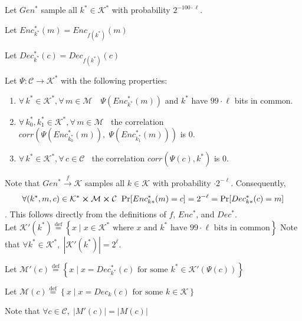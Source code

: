 \documentclass{article}
\newcommand*{\defeq}{\stackrel{\text{def}}{=}}
\begin{document}
    Let $Gen^{*}$ sample all $k^{*} \in \mathcal{K}^{*}$ with probability $2^{-100\cdot\ell}$.
    
    Let $Enc^{*}_{k^*}(m) = Enc_{f(k^*)}(m)$
    
    Let $Dec^{*}_{k^*}(c) = Dec_{f(k^*)}(c)$
   
    Let $\Psi : \mathcal{C} \to \mathcal{K}^{*}$ with the following properties:
    
    \begin{enumerate}
    
    	\item $\forall\, k^{*} \in \mathcal{K}^{*}, \forall\, m \in \mathcal{M} \quad \Psi(Enc^{*}_{k^*}(m))$ and $k^*$ have $99\cdot\ell$ bits in common.
    	
    	\item $\forall\, k^{*}_0, k^{*}_1 \in \mathcal{K}^{*}, \forall\, m \in \mathcal{M} \;\;$ the correlation $corr(\Psi(Enc^{*}_{k^*_0}(m)),\; \Psi(Enc^{*}_{k^*_1}(m)))$ is $0$.
    	
    	\item $\forall\, k^{*} \in \mathcal{K}^{*}, \forall\, c \in \mathcal{C} \;\;$ the correlation $corr(\Psi(c),k^{*})$ is $0$.
   
    \end{enumerate}

    Note that $Gen^* \xrightarrow{f} \mathcal{K}$ samples all $k \in \mathcal{K}$ with probability $\cdot2^{-\ell}$. Consequently,\\ $$\forall (k^*,m,c) \in \mathcal{K^*} \cross \mathcal{M} \cross \mathcal{C}\;\; \text{Pr}[Enc^*_{k*}(m) = c] = 2^{-\ell} = \text{Pr}[Dec^*_{k*}(c) = m]$$. This follows directly from the definitions of $f$, $Enc^*$, and $Dec^{*}$.\\

	Let $\mathcal{K}'(k^*) \defeq \left\{ x  \;|\; x \in \mathcal{K^*} \text{ where } x \text{ and } k^* \text{ have } 99\cdot\ell \text { bits in common} \right\}$
    Note that $\forall k^* \in \mathcal{K}^*,\; |\mathcal{K}'(k^*)| = 2^\ell$. %
    
  	Let $\mathcal{M}'(c) \defeq \left\{ x  \;|\; x = Dec^{*}_{k^*}(c) \text { for some } k^* \in \mathcal{K'}(\Psi(c))\right\}$
  	
  	Let $\mathcal{M}(c) \defeq \left\{ x  \;|\; x = Dec_k(c) \text { for some } k \in \mathcal{K} \right\}$
  	
  	Note that $\forall c \in \mathcal{C},\; |{M}'(c)| = |{M}(c)|$\\
    
\end{document}
